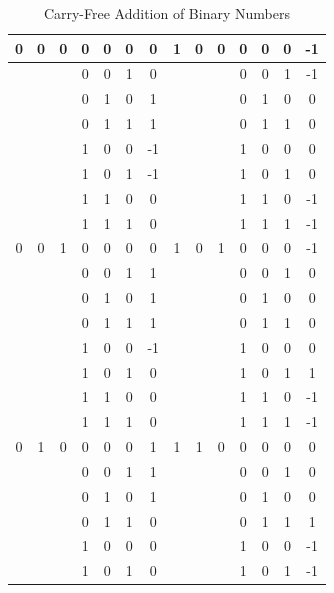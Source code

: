 \documentclass[conference]{IEEEtran}
\begin{document}
\vspace{-.5em}
\setlength{\tabcolsep}{0.5em}
\begin{table}[h!]
  \centering
  \caption{Carry-Free Addition of Binary Numbers}
  \label{tab:table5}
  \begin{tabular}{|c|c|c|c|c|c||c|||c|c|c|c|c|c||c|}
    \hline
    0 & 0 & 0 & 0 & 0 & 0 & 0  &  1 & 0 & 0 & 0 & 0 & 0 & -1 \\
    \hline
    & & & 0 & 0 & 1 & 0  &  & & & 0 & 0 & 1 & -1 \\
    \hline
    & & & 0 & 1 & 0 & 1  &  & & & 0 & 1 & 0 & 0 \\
    \hline
    & & & 0 & 1 & 1 & 1  &  & & & 0 & 1 & 1 & 0 \\
    \hline
    & & & 1 & 0 & 0 & -1  &  & & & 1 & 0 & 0 & 0 \\
    \hline
    & & & 1 & 0 & 1 & -1  &  & & & 1 & 0 & 1 & 0 \\
    \hline
    & & & 1 & 1 & 0 & 0  &  & & & 1 & 1 & 0 & -1 \\
    \hline
    & & & 1 & 1 & 1 & 0  &  & & & 1 & 1 & 1 & -1 \\
    \hline
    0 & 0 & 1 & 0 & 0 & 0 & 0  &  1 & 0 & 1 & 0 & 0 & 0 & -1 \\
    \hline
    & & & 0 & 0 & 1 & 1  &  & & & 0 & 0 & 1 & 0 \\
    \hline
    & & & 0 & 1 & 0 & 1  &  & & & 0 & 1 & 0 & 0 \\
    \hline
    & & & 0 & 1 & 1 & 1  &  & & & 0 & 1 & 1 & 0 \\
    \hline
    & & & 1 & 0 & 0 & -1  &  & & & 1 & 0 & 0 & 0 \\
    \hline
    & & & 1 & 0 & 1 & 0  &  & & & 1 & 0 & 1 & 1 \\
    \hline
    & & & 1 & 1 & 0 & 0  &  & & & 1 & 1 & 0 & -1 \\
    \hline
    & & & 1 & 1 & 1 & 0  &  & & & 1 & 1 & 1 & -1 \\
    \hline
    0 & 1 & 0 & 0 & 0 & 0 & 1  &  1 & 1 & 0 & 0 & 0 & 0 & 0 \\
    \hline
    & & & 0 & 0 & 1 & 1  &  & & & 0 & 0 & 1 & 0 \\
    \hline
    & & & 0 & 1 & 0 & 1  &  & & & 0 & 1 & 0 & 0 \\
    \hline
    & & & 0 & 1 & 1 & 0  &  & & & 0 & 1 & 1 & 1 \\
    \hline
    & & & 1 & 0 & 0 & 0  &  & & & 1 & 0 & 0 & -1 \\
    \hline
    & & & 1 & 0 & 1 & 0  &  & & & 1 & 0 & 1 & -1 \\

\end{tabular}
\end{table}
\end{document}
